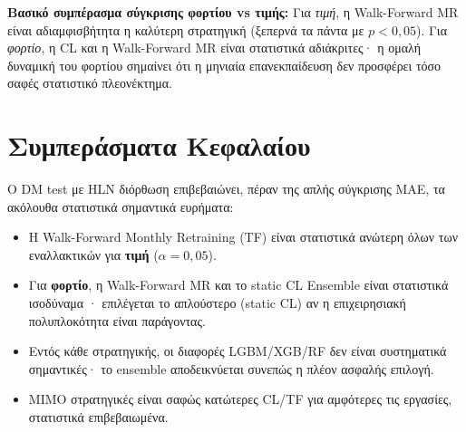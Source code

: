 \medskip
\noindent\textbf{Βασικό συμπέρασμα σύγκρισης φορτίου vs τιμής:} Για \textit{τιμή},
η Walk-Forward MR είναι αδιαμφισβήτητα η καλύτερη στρατηγική (ξεπερνά τα πάντα
με $p<0{,}05$). Για \textit{φορτίο}, η CL και η Walk-Forward MR είναι στατιστικά
αδιάκριτες· η ομαλή δυναμική του φορτίου σημαίνει ότι η μηνιαία επανεκπαίδευση
δεν προσφέρει τόσο σαφές στατιστικό πλεονέκτημα.

\section{Συμπεράσματα Κεφαλαίου}
\label{sec:dm_conclusions}

Ο DM test με HLN διόρθωση επιβεβαιώνει, πέραν της απλής σύγκρισης MAE, τα
ακόλουθα στατιστικά σημαντικά ευρήματα:

\begin{itemize}
    \item Η Walk-Forward Monthly Retraining (TF) είναι στατιστικά ανώτερη
    όλων των εναλλακτικών για \textbf{τιμή} ($\alpha = 0{,}05$).
    \item Για \textbf{φορτίο}, η Walk-Forward MR και το static CL Ensemble
    είναι στατιστικά ισοδύναμα · επιλέγεται το απλούστερο (static CL)
    αν η επιχειρησιακή πολυπλοκότητα είναι παράγοντας.
    \item Εντός κάθε στρατηγικής, οι διαφορές LGBM/XGB/RF δεν είναι
    συστηματικά σημαντικές· το ensemble αποδεικνύεται συνεπώς η πλέον ασφαλής
    επιλογή.
    \item MIMO στρατηγικές είναι σαφώς κατώτερες CL/TF για αμφότερες τις
    εργασίες, στατιστικά επιβεβαιωμένα.
\end{itemize}
